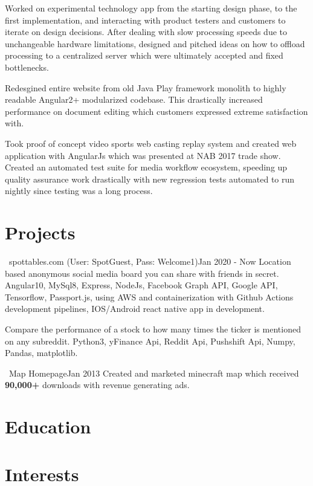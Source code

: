 \documentclass{my_resume}
\begin{document}
\workitemstwo
{Worked on experimental technology app from the starting design phase, to the first implementation, and interacting
with product testers and customers to iterate on design decisions.}
{After dealing with slow processing speeds due to unchangeable hardware limitations, designed and pitched ideas on how to offload
processing to a centralized server which were ultimately accepted and fixed bottlenecks.}

\workitemsone
{Redesgined entire website from old Java Play framework monolith to highly readable Angular2+ modularized codebase. This drastically increased performance
 on document editing which customers expressed extreme satisfaction with.}

\workitemstwo
{Took proof of concept video sports web casting replay system and created web application with AngularJs
 which was presented at NAB 2017 trade show.}
{Created an automated test suite for media workflow ecosystem, speeding up quality assurance work drastically with new regression tests
 automated to run nightly since testing was a long process.}

\section{Projects}

{\faChrome~spottables.com (User: SpotGuest, Pass: Welcome1)}{Jan 2020 - Now}
\projectitem
{Location based anonymous social media board you can share with friends in secret.}
{Angular10, MySql8, Express, NodeJs, Facebook Graph API, Google API, Tensorflow, Passport.js,
  using AWS and containerization with Github Actions development pipelines, IOS/Android react native app in development.}

\projectitem
{Compare the performance of a stock to how many times the ticker is mentioned on any subreddit.}
{Python3, yFinance Api, Reddit Api, Pushshift Api, Numpy, Pandas, matplotlib.}

{\faChrome~Map Homepage}{Jan 2013}
\projectitemone
{Created and marketed minecraft map which received \textbf{90,000+} downloads with revenue generating ads.}

\section{Education}

\section{Interests}
\end{document}
